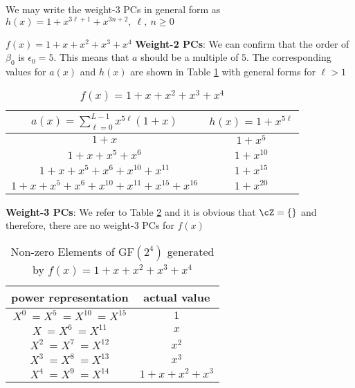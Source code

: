 \begin{example}
We may write the weight-3 PCs in general form as $h(x)=1+x^{3\ell+1}+x^{3n+2},~\ell,~n \geq 0$ 

\label{ex-1}
\end{example}




\begin{example}
$f(x)=1+x+x^2+x^3+x^4$\newline
\textbf{Weight-2 PCs}: 
We can confirm that the order of $\beta_0$ is $\epsilon_0=5$. This means that $a$ should be a multiple of $5$. The corresponding values for $a(x)$ and $h(x)$ are shown in Table \ref{novelTab3} with general forms for $\ell>1$

\begin{table}[htbp]
\caption{$f(x)=1+x+x^2+x^3+x^4$}
\centering
\begin{tabular}{c c} 
 \hline
 $a(x)=\sum_{\ell=0}^{L-1} x^{5\ell}(1+x)$ & $h(x)=1+x^{5\ell}$  \\ [0.5ex] 
 \hline\hline
$1+x$ &$1+x^5$\\ 
$1+x+x^5+x^6$ &$1+x^{10}$  \\
$1+x+x^5+x^6+x^{10}+x^{11}$ & $1+x^{15}$ \\
$1+x+x^5+x^6+x^{10}+x^{11}+x^{15}+x^{16}$ &$1+x^{20}$  
 \end{tabular}
 \label{novelTab3}
\end{table}
\newpage
\textbf{Weight-3 PCs}:
We refer to Table \ref{novelTabWt3-2} and it is obvious that $\cZ=\{ \}$ and therefore, there are no weight-3 PCs for $f(x)$
 \begin{table}[htbp]
 \caption{Non-zero Elements of GF$(2^4)$ generated by $f(x)=1+x+x^2+x^3+x^4$}
\centering
 \begin{tabular}{c c} 
 \hline
 power representation & actual value \\ [0.5ex] 
 \hline\hline
$X^0~=X^5~=X^{10}~=X^{15}$ & $1$\\
\hline
$X~=X^6~=X^{11}$ & $x$\\
\hline
$X^2~=X^7~=X^{12}$ &  $x^2$\\
\hline
$X^3~=X^8~=X^{13}$ &  $x^3$\\
\hline
$X^4~=X^9~=X^{14}$ &  $1+x+x^2+x^3$\\
\hline
 \end{tabular}
 \label{novelTabWt3-2}
\end{table}
\label{ex-2}
\end{example}

